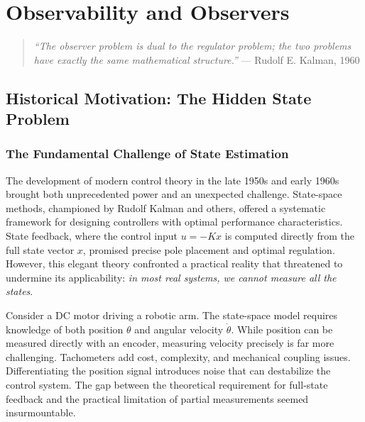 
\chapter{Observability and Observers}
\label{ch:observability}

\begin{quote}
\textit{``The observer problem is dual to the regulator problem; the two problems have exactly the same mathematical structure.''} --- Rudolf E. Kalman, 1960
\end{quote}

\section{Historical Motivation: The Hidden State Problem}

\subsection{The Fundamental Challenge of State Estimation}

The development of modern control theory in the late 1950s and early 1960s brought both unprecedented power and an unexpected challenge. State-space methods, championed by Rudolf Kalman and others, offered a systematic framework for designing controllers with optimal performance characteristics. State feedback, where the control input $u = -Kx$ is computed directly from the full state vector $x$, promised precise pole placement and optimal regulation. However, this elegant theory confronted a practical reality that threatened to undermine its applicability: \textit{in most real systems, we cannot measure all the states}.

Consider a DC motor driving a robotic arm. The state-space model requires knowledge of both position $\theta$ and angular velocity $\dot{\theta}$. While position can be measured directly with an encoder, measuring velocity precisely is far more challenging. Tachometers add cost, complexity, and mechanical coupling issues. Differentiating the position signal introduces noise that can destabilize the control system. The gap between the theoretical requirement for full-state feedback and the practical limitation of partial measurements seemed insurmountable.

